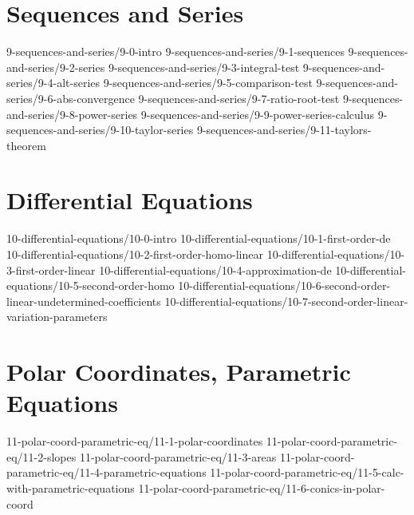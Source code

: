 \chapter{Sequences and Series}\label{chap:SequencesSeries}
	{9-sequences-and-series/9-0-intro}
	{9-sequences-and-series/9-1-sequences}
	{9-sequences-and-series/9-2-series}
	{9-sequences-and-series/9-3-integral-test}
	{9-sequences-and-series/9-4-alt-series}
	{9-sequences-and-series/9-5-comparison-test}
	{9-sequences-and-series/9-6-abs-convergence}
	{9-sequences-and-series/9-7-ratio-root-test}
	{9-sequences-and-series/9-8-power-series}
	{9-sequences-and-series/9-9-power-series-calculus}
	{9-sequences-and-series/9-10-taylor-series}
	{9-sequences-and-series/9-11-taylors-theorem}

\chapter{Differential Equations}\label{chap:DifferentialEquations}
	{10-differential-equations/10-0-intro}
	{10-differential-equations/10-1-first-order-de}
	{10-differential-equations/10-2-first-order-homo-linear}
	{10-differential-equations/10-3-first-order-linear}
	{10-differential-equations/10-4-approximation-de}
	{10-differential-equations/10-5-second-order-homo}
	{10-differential-equations/10-6-second-order-linear-undetermined-coefficients}
	{10-differential-equations/10-7-second-order-linear-variation-parameters}

\chapter{Polar Coordinates, Parametric Equations}\label{chap:PolarParametricEquations}
	{11-polar-coord-parametric-eq/11-1-polar-coordinates}
	{11-polar-coord-parametric-eq/11-2-slopes}
	{11-polar-coord-parametric-eq/11-3-areas}
	{11-polar-coord-parametric-eq/11-4-parametric-equations}
	{11-polar-coord-parametric-eq/11-5-calc-with-parametric-equations}	
	{11-polar-coord-parametric-eq/11-6-conics-in-polar-coord}
	
